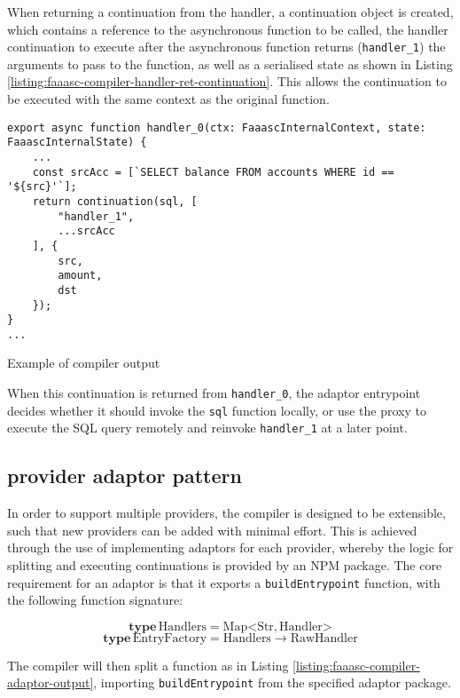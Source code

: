 When returning a continuation from the handler, a continuation object is created, which contains a reference to the asynchronous function to be called, the handler continuation to execute after the asynchronous function returns (\verb|handler_1|) the arguments to pass to the function, as well as a serialised state as shown in Listing \ref{listing:faaasc-compiler-handler-ret-continuation}. This allows the continuation to be executed with the same context as the original function.

\begin{listing}[H]
\begin{verbatim}
export async function handler_0(ctx: FaaascInternalContext, state: FaaascInternalState) {
    ...
    const srcAcc = [`SELECT balance FROM accounts WHERE id == '${src}'`];
    return continuation(sql, [
        "handler_1",
        ...srcAcc
    ], {
        src,
        amount,
        dst
    });
}
...
\end{verbatim}
\caption{Example of \faaasc{} compiler output}
\label{listing:faaasc-compiler-handler-ret-continuation}
\end{listing}

When this continuation is returned from \verb|handler_0|, the adaptor entrypoint decides whether it should invoke the \verb|sql| function locally, or use the proxy to execute the SQL query remotely and reinvoke \verb|handler_1| at a later point.

\subsection{\faas{} provider adaptor pattern}
In order to support multiple \faas{} providers, the \faaasc{} compiler is designed to be extensible, such that new providers can be added with minimal effort. This is achieved through the use of implementing adaptors for each \faas{} provider, whereby the logic for splitting and executing continuations is provided by an NPM package. The core requirement for an adaptor is that it exports a \verb|buildEntrypoint| function, with the following function signature:

\begin{signature}
$$\textbf{type}\, \textrm{Handlers} = \textrm{Map}\mathord{<}\textrm{Str}, \textrm{Handler}\mathord{>}$$
$$\textbf{type}\, \textrm{EntryFactory} = \textrm{Handlers} \rightarrow \textrm{RawHandler}$$
\end{signature}

The \faaasc{} compiler will then split a function as in Listing \ref{listing:faaasc-compiler-adaptor-output}, importing \verb|buildEntrypoint| from the specified adaptor package.

